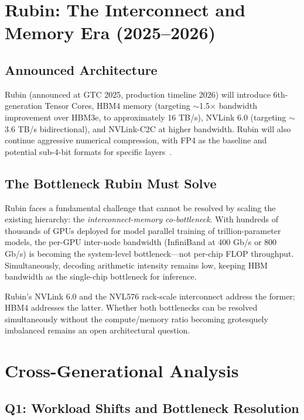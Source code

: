 \documentclass[10pt,twocolumn]{article}
\begin{document}
\section{Rubin: The Interconnect and Memory Era (2025--2026)}
\label{sec:rubin}

\subsection{Announced Architecture}

Rubin (announced at GTC 2025, production timeline 2026) will introduce 6th-generation Tensor Cores, HBM4 memory (targeting $\sim$1.5$\times$ bandwidth improvement over HBM3e, to approximately 16 TB/s), NVLink 6.0 (targeting $\sim$3.6 TB/s bidirectional), and NVLink-C2C at higher bandwidth. Rubin will also continue aggressive numerical compression, with FP4 as the baseline and potential sub-4-bit formats for specific layers~\citep{nvidia2025rubin}.

\subsection{The Bottleneck Rubin Must Solve}

Rubin faces a fundamental challenge that cannot be resolved by scaling the existing hierarchy: the \textit{interconnect-memory co-bottleneck}. With hundreds of thousands of GPUs deployed for model parallel training of trillion-parameter models, the per-GPU inter-node bandwidth (InfiniBand at 400 Gb/s or 800 Gb/s) is becoming the system-level bottleneck—not per-chip FLOP throughput. Simultaneously, decoding arithmetic intensity remains low, keeping HBM bandwidth as the single-chip bottleneck for inference.

Rubin's NVLink 6.0 and the NVL576 rack-scale interconnect address the former; HBM4 addresses the latter. Whether both bottlenecks can be resolved simultaneously without the compute/memory ratio becoming grotesquely imbalanced remains an open architectural question.

\section{Cross-Generational Analysis}
\label{sec:crossgen}

\subsection{Q1: Workload Shifts and Bottleneck Resolution}
\end{document}

